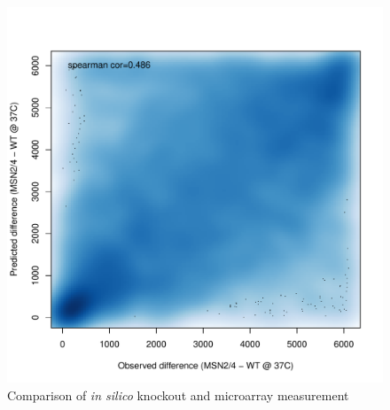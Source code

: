 \documentclass{article}
\begin{document}
\begin{figure}
\includegraphics[width=\textwidth]{fig/msn24_ko_37C_diff_expr_rank.pdf}
\caption{Comparison of \textit{in silico} knockout and microarray measurement}
\label{msn24_ko_37C_diff_expr_rank}
\end{figure}





\end{document}
